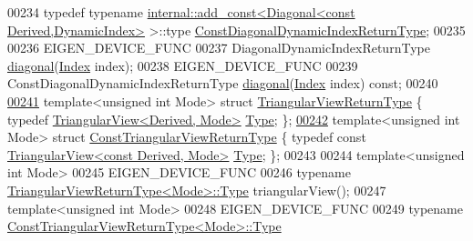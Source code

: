 \begin{DoxyCode}
00234     \textcolor{keyword}{typedef} \textcolor{keyword}{typename} \hyperlink{struct_eigen_1_1internal_1_1add__const}{internal::add\_const<Diagonal<const Derived,DynamicIndex>}
       >::type \hyperlink{group___core___module_class_eigen_1_1_transpose}{ConstDiagonalDynamicIndexReturnType};
00235 
00236     EIGEN\_DEVICE\_FUNC
00237     DiagonalDynamicIndexReturnType \hyperlink{group___core___module_ab5768147536273eb2dbdfa389cfd26a3}{diagonal}(\hyperlink{namespace_eigen_a62e77e0933482dafde8fe197d9a2cfde}{Index} index);
00238     EIGEN\_DEVICE\_FUNC
00239     ConstDiagonalDynamicIndexReturnType \hyperlink{group___core___module_ab5768147536273eb2dbdfa389cfd26a3}{diagonal}(\hyperlink{namespace_eigen_a62e77e0933482dafde8fe197d9a2cfde}{Index} index) \textcolor{keyword}{const};
00240 
\hyperlink{struct_eigen_1_1_matrix_base_1_1_triangular_view_return_type}{00241}     \textcolor{keyword}{template}<\textcolor{keywordtype}{unsigned} \textcolor{keywordtype}{int} Mode> \textcolor{keyword}{struct }\hyperlink{struct_eigen_1_1_matrix_base_1_1_triangular_view_return_type}{TriangularViewReturnType} \{ \textcolor{keyword}{typedef} 
      \hyperlink{group___core___module_class_eigen_1_1_triangular_view}{TriangularView<Derived, Mode>} \hyperlink{group___core___module_class_eigen_1_1_triangular_view}{Type}; \};
\hyperlink{struct_eigen_1_1_matrix_base_1_1_const_triangular_view_return_type}{00242}     \textcolor{keyword}{template}<\textcolor{keywordtype}{unsigned} \textcolor{keywordtype}{int} Mode> \textcolor{keyword}{struct }\hyperlink{struct_eigen_1_1_matrix_base_1_1_const_triangular_view_return_type}{ConstTriangularViewReturnType} \{ \textcolor{keyword}{typedef}
       \textcolor{keyword}{const} \hyperlink{group___core___module_class_eigen_1_1_triangular_view}{TriangularView<const Derived, Mode>} 
      \hyperlink{group___core___module_class_eigen_1_1_triangular_view}{Type}; \};
00243 
00244     \textcolor{keyword}{template}<\textcolor{keywordtype}{unsigned} \textcolor{keywordtype}{int} Mode>
00245     EIGEN\_DEVICE\_FUNC
00246     \textcolor{keyword}{typename} \hyperlink{group___core___module_class_eigen_1_1_triangular_view}{TriangularViewReturnType<Mode>::Type} triangularView();
00247     \textcolor{keyword}{template}<\textcolor{keywordtype}{unsigned} \textcolor{keywordtype}{int} Mode>
00248     EIGEN\_DEVICE\_FUNC
00249     \textcolor{keyword}{typename} \hyperlink{group___core___module_class_eigen_1_1_triangular_view}{ConstTriangularViewReturnType<Mode>::Type} 

\end{DoxyCode}
